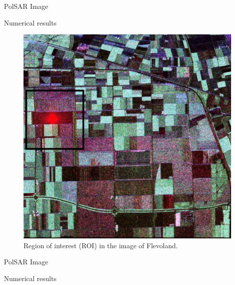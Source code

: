 \documentclass[10pt]{beamer}
\begin{document}
\begin{frame}[fragile]{PolSAR Image}
\begin{alertblock}{Numerical results}
	\begin{figure}[hbt]
\centering
	\includegraphics[width=.5\linewidth]{flevoland_radial_4_look_black}
	\caption{Region of interest (ROI) in the image of Flevoland.}
\label{flevoland_radial_4look}
\end{figure}
\end{alertblock}
\end{frame}


\begin{frame}[fragile]{PolSAR Image}
\begin{alertblock}{Numerical results}
	\begin{figure}[hbt]
	\centering
     \qquad
     \qquad
     \label{evidencias_hh_hv_vv}
   \end{figure}	
\end{alertblock}
\end{frame}
\end{document}
